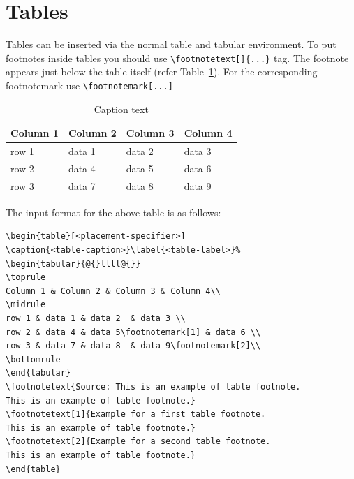 \documentclass{svproc}
\begin{document}
\section{Tables}\label{sec5}

Tables can be inserted via the normal table and tabular environment. To put
footnotes inside tables you should use \verb+\footnotetext[]{...}+ tag.
The footnote appears just below the table itself (refer Table~\ref{tab1}). 
For the corresponding footnotemark use \verb+\footnotemark[...]+

\begin{table}[h]
\centering
\caption{Caption text}\label{tab1}%
\begin{tabular}{@{}llll@{}}
\toprule
Column 1 & Column 2  & Column 3 & Column 4\\
\midrule
row 1    & data 1   & data 2  & data 3  \\
row 2    & data 4   & data 5\footnotemark[1]  & data 6  \\
row 3    & data 7   & data 8  & data 9\footnotemark[2]  \\
\bottomrule
\end{tabular}
\end{table}

\noindent
The input format for the above table is as follows:

\bigskip
\begin{verbatim}
\begin{table}[<placement-specifier>]
\caption{<table-caption>}\label{<table-label>}%
\begin{tabular}{@{}llll@{}}
\toprule
Column 1 & Column 2 & Column 3 & Column 4\\
\midrule
row 1 & data 1 & data 2	 & data 3 \\
row 2 & data 4 & data 5\footnotemark[1] & data 6 \\
row 3 & data 7 & data 8	 & data 9\footnotemark[2]\\
\bottomrule
\end{tabular}
\footnotetext{Source: This is an example of table footnote. 
This is an example of table footnote.}
\footnotetext[1]{Example for a first table footnote.
This is an example of table footnote.}
\footnotetext[2]{Example for a second table footnote. 
This is an example of table footnote.}
\end{table}
\end{verbatim}
\bigskip
\end{document}
